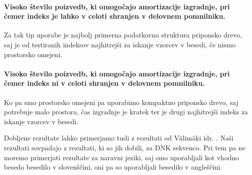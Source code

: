 \paragraph{Visoko število poizvedb, ki omogočajo amortizacije izgradnje, pri čemer indeks je lahko v celoti shranjen v delovnem pomnilniku.} Za tak tip uporabe je najbolj primerna podatkovna struktura priponsko drevo, saj je od testiranih indeksov najhitrejši za iskanje vzorcev v besedi, če nismo prostorsko omejeni.

\paragraph{Visoko število poizvedb, ki omogočajo amortizacije izgradnje, pri čemer indeks ni v celoti shranjen v delovnem pomnilniku.} Ko pa smo prostorsko omejeni pa uporabimo kompaktno priponsko drevo, saj potrebuje malo prostora, čas izgradnje je kratek ter je drugi najhitrejši indeks za iskanje vzorcev v besedi.


Dobljene rezultate lahko primerjamo tudi z rezultati od Välimäki idr. \cite{Valimaki2007}. Naši rezultati sovpadajo z rezultati, ki so jih dobili, za DNK sekvenco. Pri tem pa ne moremo primerjati rezultate za naravni jeziki, saj smo uporabljali kot vhodno besedo besedilo v slovenščini, oni pa so uporabljali besedilo v angleščini.